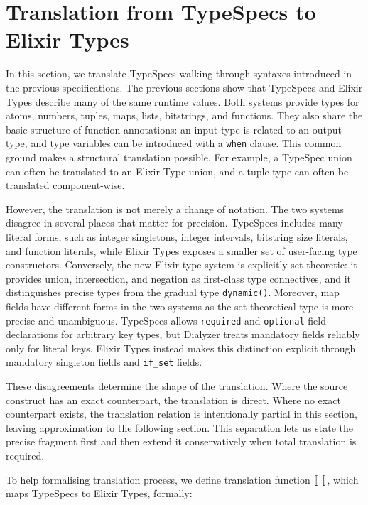 \section{Translation from TypeSpecs to Elixir Types}
\label{sec:translation-eqs}

In this section, we translate TypeSpecs walking through syntaxes introduced in the previous specifications.
The previous sections show that TypeSpecs and Elixir Types describe many of the same runtime values.
Both systems provide types for atoms, numbers, tuples, maps, lists, bitstrings, and functions.
They also share the basic structure of function annotations: an input type is related to an output type, and type variables can be introduced with a \texttt{when} clause.
This common ground makes a structural translation possible.
For example, a TypeSpec union can often be translated to an Elixir Type union, and a tuple type can often be translated component-wise.

However, the translation is not merely a change of notation.
The two systems disagree in several places that matter for precision.
TypeSpecs includes many literal forms, such as integer singletons, integer intervals, bitstring size literals, and function literals, while Elixir Types exposes a smaller set of user-facing type constructors.
Conversely, the new Elixir type system is explicitly set-theoretic: it provides union, intersection, and negation as first-class type connectives, and it distinguishes precise types from the gradual type \texttt{dynamic()}.
Moreover, map fields have different forms in the two systems as the set-theoretical type is more precise and unambiguous.
TypeSpecs allows \texttt{required} and \texttt{optional} field declarations for arbitrary key types, but Dialyzer treats mandatory fields reliably only for literal keys.
Elixir Types instead makes this distinction explicit through mandatory singleton fields and \texttt{if\_set} fields.

These disagreements determine the shape of the translation.
Where the source construct has an exact counterpart, the translation is direct.
Where no exact counterpart exists, the translation relation is intentionally partial in this section, leaving approximation to the following section.
This separation lets us state the precise fragment first and then extend it conservatively when total translation is required.

To help formalising translation process, we define translation function $[\![\hspace{.07em}\,\,\hspace{.07em}]\!]$, which maps TypeSpecs to Elixir Types, formally:

